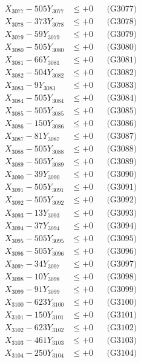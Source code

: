 \documentclass[a4paper,10pt]{article}
\begin{document}
{\begin{align}
X_{3077} - 505Y_{3077} &\leq +0 && \text{(G3077)} \\
X_{3078} - 373Y_{3078} &\leq +0 && \text{(G3078)} \\
X_{3079} - 59Y_{3079} &\leq +0 && \text{(G3079)} \\
X_{3080} - 505Y_{3080} &\leq +0 && \text{(G3080)} \\
\allowbreak
X_{3081} - 66Y_{3081} &\leq +0 && \text{(G3081)} \\
X_{3082} - 504Y_{3082} &\leq +0 && \text{(G3082)} \\
X_{3083} - 9Y_{3083} &\leq +0 && \text{(G3083)} \\
X_{3084} - 505Y_{3084} &\leq +0 && \text{(G3084)} \\
X_{3085} - 505Y_{3085} &\leq +0 && \text{(G3085)} \\
X_{3086} - 150Y_{3086} &\leq +0 && \text{(G3086)} \\
X_{3087} - 81Y_{3087} &\leq +0 && \text{(G3087)} \\
X_{3088} - 505Y_{3088} &\leq +0 && \text{(G3088)} \\
X_{3089} - 505Y_{3089} &\leq +0 && \text{(G3089)} \\
X_{3090} - 39Y_{3090} &\leq +0 && \text{(G3090)} \\
\allowbreak
X_{3091} - 505Y_{3091} &\leq +0 && \text{(G3091)} \\
X_{3092} - 505Y_{3092} &\leq +0 && \text{(G3092)} \\
X_{3093} - 13Y_{3093} &\leq +0 && \text{(G3093)} \\
X_{3094} - 37Y_{3094} &\leq +0 && \text{(G3094)} \\
X_{3095} - 505Y_{3095} &\leq +0 && \text{(G3095)} \\
X_{3096} - 505Y_{3096} &\leq +0 && \text{(G3096)} \\
X_{3097} - 34Y_{3097} &\leq +0 && \text{(G3097)} \\
X_{3098} - 10Y_{3098} &\leq +0 && \text{(G3098)} \\
X_{3099} - 91Y_{3099} &\leq +0 && \text{(G3099)} \\
X_{3100} - 623Y_{3100} &\leq +0 && \text{(G3100)} \\
\allowbreak
X_{3101} - 150Y_{3101} &\leq +0 && \text{(G3101)} \\
X_{3102} - 623Y_{3102} &\leq +0 && \text{(G3102)} \\
X_{3103} - 461Y_{3103} &\leq +0 && \text{(G3103)} \\
X_{3104} - 250Y_{3104} &\leq +0 && \text{(G3104)} \\

\end{align}}
\end{document}
